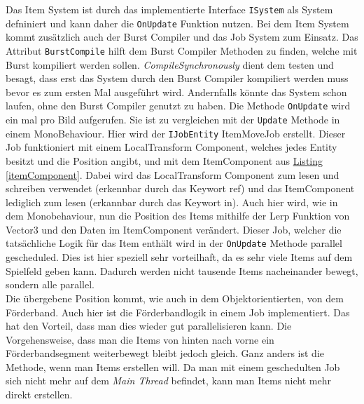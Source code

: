 Das Item System ist durch das implementierte Interface \texttt{ISystem} als System defniniert und kann daher die \texttt{OnUpdate} Funktion nutzen. Bei dem Item System kommt zusätzlich auch der Burst Compiler und das Job System zum Einsatz. Das Attribut \texttt{BurstCompile} hilft dem Burst Compiler Methoden zu finden, welche mit Burst kompiliert werden sollen. \textit{CompileSynchronously} dient dem testen und besagt, dass erst das System durch den Burst Compiler kompiliert werden muss bevor es zum ersten Mal ausgeführt wird. Andernfalls könnte das System schon laufen, ohne den Burst Compiler genutzt zu haben. Die Methode \texttt{OnUpdate} wird ein mal pro Bild aufgerufen. Sie ist zu vergleichen mit der \texttt{Update} Methode in einem MonoBehaviour. Hier wird der \texttt{IJobEntity} ItemMoveJob erstellt. Dieser Job funktioniert mit einem LocalTransform Component, welches jedes Entity besitzt und die Position angibt, und mit dem ItemComponent aus \hyperref[itemComponent]{Listing \ref{itemComponent}}. Dabei wird das LocalTransform Component zum lesen und schreiben verwendet (erkennbar durch das Keywort ref) und das ItemComponent lediglich zum lesen (erkannbar durch das Keywort in). Auch hier wird, wie in dem Monobehaviour, nun die Position des Items mithilfe der Lerp Funktion von Vector3 und den Daten im ItemComponent verändert. Dieser Job, welcher die tatsächliche Logik für das Item enthält wird in der \texttt{OnUpdate} Methode parallel gescheduled. Dies ist hier speziell sehr vorteilhaft, da es sehr viele Items auf dem Spielfeld geben kann. Dadurch werden nicht tausende Items nacheinander bewegt, sondern alle parallel.\\
Die übergebene Position kommt, wie auch in dem Objektorientierten, von dem Förderband. Auch hier ist die Förderbandlogik in einem Job implementiert. Das hat den Vorteil, dass man dies wieder gut parallelisieren kann. Die Vorgehensweise, dass man die Items von hinten nach vorne ein Förderbandsegment weiterbewegt bleibt jedoch gleich. Ganz anders ist die Methode, wenn man Items erstellen will. Da man mit einem geschedulten Job sich nicht mehr auf dem \textit{Main Thread} befindet, kann man Items nicht mehr direkt erstellen.
